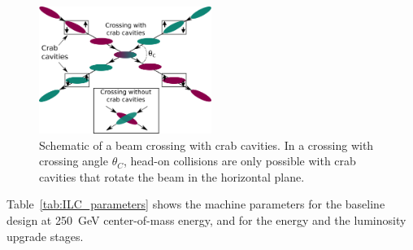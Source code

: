 \begin{figure}
\centering
\includegraphics[width=0.5\textwidth]{Figures/Crab_crossing.png}
\caption[Schematic of a beam crossing with crab cavities]{Schematic of a beam crossing with crab cavities. In a crossing with crossing angle $\theta_C$, head-on collisions are only possible with crab cavities that rotate the beam in the horizontal plane.}
\label{fig:Crab_crossing}
\end{figure}
Table~\ref{tab:ILC_parameters} shows the machine parameters for the baseline design at \SI{250}{\GeV} center-of-mass energy, and for the energy and the luminosity upgrade stages.
